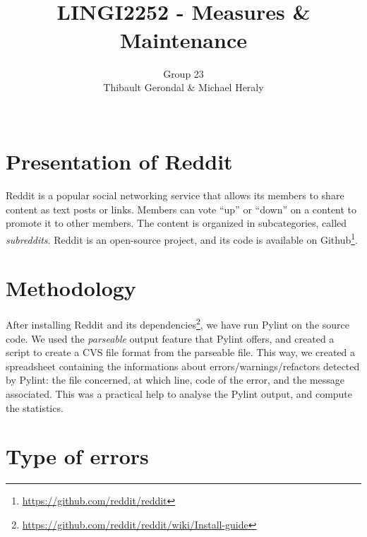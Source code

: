\documentclass[11pt, a4paper]{article}
\title{\tbf{UCL} \\
	LINGI2252 - Measures \& Maintenance}
\author{Group 23 \\
		Thibault Gerondal \& Michael Heraly \\
		\\
		\tit{Teacher: Kim Mens}}
\newcommand{\tit}[1]{\textit{#1}}
\newcommand{\pyl}{\textsf{Pylint}}
\begin{document}
\maketitle


\section*{Presentation of Reddit}

Reddit is a popular social networking service that allows its members to share content as text posts or links.
Members can vote ``up'' or ``down'' on a content to promote it to other members.
The content is organized in subcategories, called \tit{subreddits}.
Reddit is an open-source project, and its code is available on Github\footnote{\url{https://github.com/reddit/reddit}}.


\section{Methodology}

After installing Reddit and its dependencies\footnote{\url{https://github.com/reddit/reddit/wiki/Install-guide}}, we have run \pyl{} on the source code.
We used the \tit{parseable} output feature that \pyl{} offers, and created a script to create a CVS file format from the parseable file.
This way, we created a spreadsheet containing the informations about errors/warnings/refactors detected by \pyl{}: the file concerned, at which line, code of the error, and the message associated.
This was a practical help to analyse the \pyl{} output, and compute the statistics.


\section{Type of errors}
\end{document}
